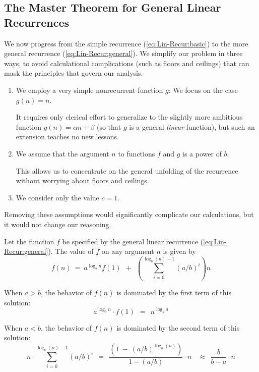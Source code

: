 \subsection{The Master Theorem for General Linear Recurrences} 
\label{sec:linear-recurrence-general}

We now progress from the simple recurrence (\ref{eq:Lin-Recur:basic}) to the more general recurrence (\ref{eq:Lin-Recur:general}).  We simplify our problem in three ways, to avoid calculational complications (such as floors and ceilings) that can mask the principles that govern
our analysis.
\begin{enumerate}
\item
We employ a very simple nonrecurrent function $g$: We focus on the case $g(n) = n$.

\smallskip

It requires only clerical effort to generalize to the slightly more ambitious function $g(n) = \alpha n + \beta$ (so that $g$ is a general {\em linear} function), but such an extension teaches no new lessons.
\medskip\item
We assume that the argument $n$ to functions $f$ and $g$ is a power of $b$.

\smallskip

This allows us to concentrate on the general unfolding of the recurrence without worrying about floors and ceilings.

\medskip\item
We consider only the value $c=1$.
\end{enumerate}
Removing these assumptions would significantly complicate our calculations, but it would not change our reasoning.

\begin{theorem}
\label{thm:master-thm-genl}
Let the function $f$ be specified by the general linear recurrence (\ref{eq:Lin-Recur:general}). The value of $f$ on any argument $n$ is given by
\[
f(n) \ = \ 
a^{\log_b n} f(1) \ \ + \ \ \left( \sum_{i=0}^{\log_b (n)-1} (a/b)^i \right) n
\]

\smallskip

\noindent
When $a > b$, the behavior of $f(n)$ is dominated by the first term of this solution:
\[ a^{\log_b n} \cdot  f(1) \ \ = \ \ n^{\log_b a} \]

\smallskip

\noindent
When $a < b$, the behavior of $f(n)$ is dominated by the second term of this solution:
\[
n \cdot \sum_{i=0}^{\log_b (n)-1} (a/b)^i
  \ \ = \ \
\frac{\left( 1 \ - \  (a/b)^{\log_b (n)} \right)}{1- (a/b)} \cdot n \ \
  \ \ \approx \ \
\frac{b}{b - a} \cdot n
\]
\end{theorem}

